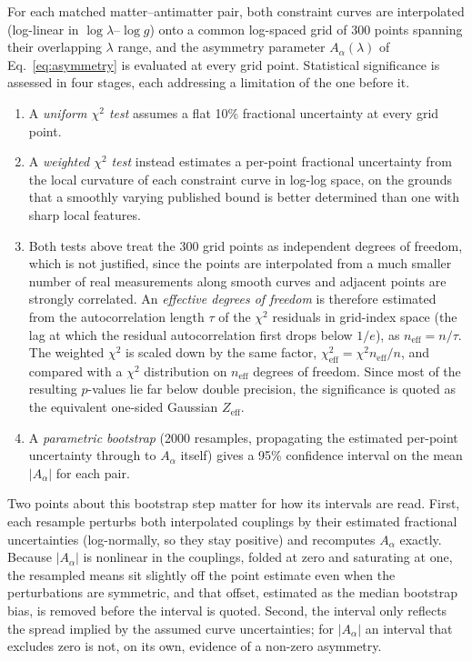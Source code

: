 For each matched matter--antimatter pair, both constraint curves are
interpolated (log-linear in $\log\lambda$--$\log g$) onto a common
log-spaced grid of 300 points spanning their overlapping $\lambda$ range,
and the asymmetry parameter $A_\alpha(\lambda)$ of Eq.~\eqref{eq:asymmetry}
is evaluated at every grid point. Statistical significance is assessed in
four stages, each addressing a limitation of the one before it.

\begin{enumerate}
  \item A \emph{uniform $\chi^2$ test} assumes a flat 10\% fractional
    uncertainty at every grid point.
  \item A \emph{weighted $\chi^2$ test} instead estimates a per-point
    fractional uncertainty from the local curvature of each constraint
    curve in log-log space, on the grounds that a smoothly varying
    published bound is better determined than one with sharp local
    features.
  \item Both tests above treat the 300 grid points as independent degrees
    of freedom, which is not justified, since the points are interpolated
    from a much smaller number of real measurements along smooth curves and
    adjacent points are strongly correlated. An \emph{effective degrees of
    freedom} is therefore estimated from the autocorrelation length $\tau$
    of the $\chi^2$ residuals in grid-index space (the lag at which the
    residual autocorrelation first drops below $1/e$), as
    $n_{\text{eff}}=n/\tau$. The weighted $\chi^2$ is scaled down by the
    same factor, $\chi^2_{\text{eff}}=\chi^2 n_{\text{eff}}/n$, and compared
    with a $\chi^2$ distribution on $n_{\text{eff}}$ degrees of freedom.
    Since most of the resulting $p$-values lie far below double precision,
    the significance is quoted as the equivalent one-sided Gaussian
    $Z_{\text{eff}}$.
  \item A \emph{parametric bootstrap} (2000 resamples, propagating the
    estimated per-point uncertainty through to $A_\alpha$ itself) gives a
    95\% confidence interval on the mean $|A_\alpha|$ for each pair.
\end{enumerate}

Two points about this bootstrap step matter for how its intervals are
read. First, each resample perturbs both interpolated couplings by their
estimated fractional uncertainties (log-normally, so they stay positive)
and recomputes $A_\alpha$ exactly. Because $|A_\alpha|$ is nonlinear in the
couplings, folded at zero and saturating at one, the resampled means sit
slightly off the point estimate even when the perturbations are symmetric,
and that offset, estimated as the median bootstrap bias, is removed before
the interval is quoted. Second, the interval only reflects the spread
implied by the assumed curve uncertainties; for $|A_\alpha|$ an interval
that excludes zero is not, on its own, evidence of a non-zero asymmetry.


